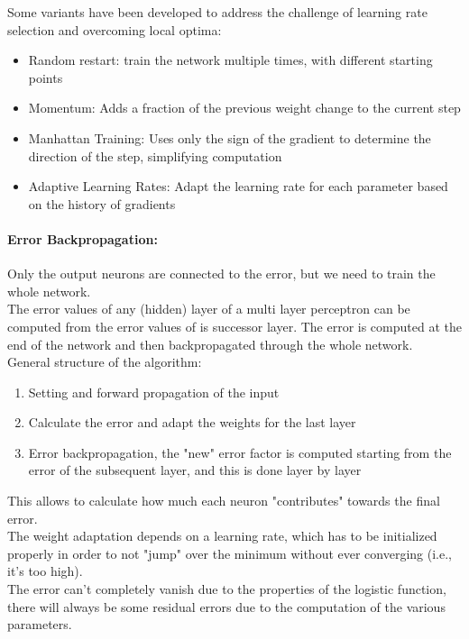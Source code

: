 Some variants have been developed to address the challenge of learning rate selection and overcoming local optima:
\begin{itemize}
	\item Random restart: train the network multiple times, with different starting points
	\item Momentum: Adds a fraction of the previous weight change to the current step
	\item Manhattan Training: Uses only the sign of the gradient to determine the direction of the step, simplifying computation
	\item Adaptive Learning Rates: Adapt the learning rate for each parameter based on the history of gradients
\end{itemize}

\paragraph{Error Backpropagation:} Only the output neurons are connected to the error, but we need to train the whole network. \\
The error values of any (hidden) layer of a multi layer perceptron can be computed from the error values of is successor layer. The error is computed at the end of the network and then backpropagated through the whole network.\\
General structure of the algorithm:
\begin{enumerate}
	\item Setting and forward propagation of the input
	\item Calculate the error and adapt the weights for the last layer
	\item Error backpropagation, the "new" error factor is computed starting from the error of the subsequent layer, and this is done layer by layer
\end{enumerate}
This allows to calculate how much each neuron "contributes" towards the final error.\\

The weight adaptation depends on a learning rate, which has to be initialized properly in order to not "jump" over the minimum without ever converging (i.e., it's too high).\\

The error can’t completely vanish due to the properties of the logistic function, there will always be some residual errors due to the computation of the various parameters.\\

